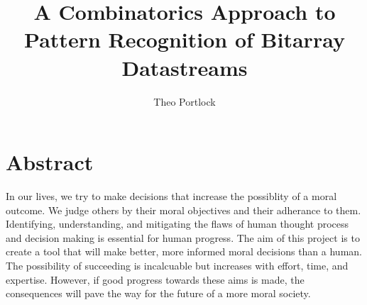 \documentclass{book}
\title{A Combinatorics Approach to Pattern Recognition of Bitarray Datastreams}
\author{Theo Portlock}
\begin{document}
\frontmatter
\maketitle

\chapter{Abstract}
In our lives, we try to make decisions that increase the possiblity of a moral outcome.
We judge others by their moral objectives and their adherance to them.
Identifying, understanding, and mitigating the flaws of human thought process and decision making is essential for human progress.
The aim of this project is to create a tool that will make better, more informed moral decisions than a human.
The possibility of succeeding is incalcuable but increases with effort, time, and expertise.
However, if good progress towards these aims is made, the consequences will pave the way for the future of a more moral society.

\cleardoublepage
{}
{}
\tableofcontents

\cleardoublepage
{}
{}
\listoffigures

\cleardoublepage
{}
{}
\listoftables

\mainmatter








\backmatter


\end{document}
